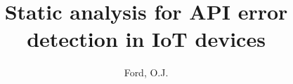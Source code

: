 \documentclass{article}
\title{Static analysis for API error detection in IoT devices}
\author{Ford, O.J.}
\begin{document}


\begin{spacing}{1.25}


\end{spacing}

\begin{spacing}{0.8}
\tableofcontents
\end{spacing}
\clearpage

\begin{spacing}{1.4}






\end{spacing}
\cleardoublepage

\pagestyle{headings}
\begin{spacing}{1.4}
\begin{appendices}
\renewcommand{\appendixname}{Appx.}

\renewcommand{\appendixname}{Annex}

\end{appendices}
\end{spacing}

\printbibliography
\end{document}
